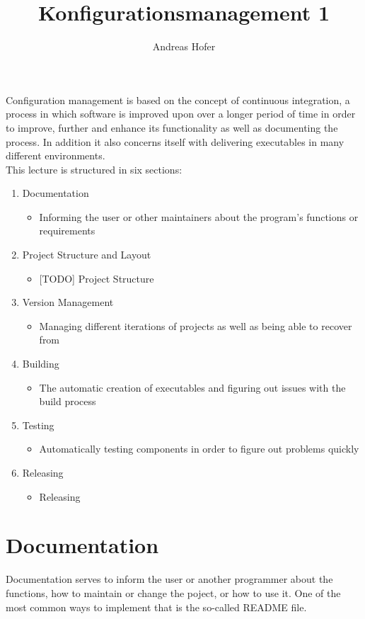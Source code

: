 \documentclass{article}
\title{\vspace{-1cm}Konfigurationsmanagement 1}
\author{Andreas Hofer}
\begin{document}
	\maketitle
	\tableofcontents
	\newpage
	Configuration management is based on the concept of continuous integration, a process in which software is improved upon over a longer period of time in order to improve, further and enhance its functionality as well as documenting the process. In addition it also concerns itself with delivering executables in many different environments. \\
	This lecture is structured in six sections:
	\begin{enumerate}
		\item{Documentation}
		\begin{itemize}
			\item{Informing the user or other maintainers about the program's functions or requirements}
		\end{itemize}
		\item{Project Structure and Layout}
		\begin{itemize}
			\item{[TODO] Project Structure}
		\end{itemize}
		\item{Version Management}
		\begin{itemize}
			\item{Managing different iterations of projects as well as being able to recover from}
		\end{itemize}
		\item{Building}
		\begin{itemize}
			\item{The automatic creation of executables and figuring out issues with the build process}
		\end{itemize}
		\item{Testing}
		\begin{itemize}
			\item{Automatically testing components in order to figure out problems quickly}
		\end{itemize}
		\item{Releasing}
		\begin{itemize}
			\item{Releasing }
		\end{itemize}
	\end{enumerate}
	\section{Documentation}
	Documentation serves to inform the user or another programmer about the functions, how to maintain or change the poject, or how to use it. One of the most common ways to implement that is the so-called README file. \\
\end{document}
